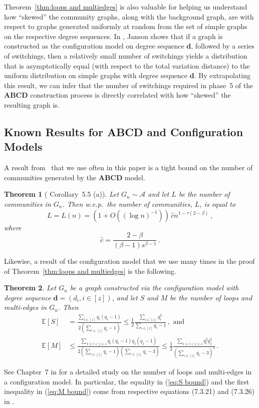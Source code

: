 \documentclass[12pt]{article}
\newtheorem{theorem}{Theorem}
\theoremstyle{definition}
\theoremstyle{remark}
\theoremstyle{remark}
\numberwithin{theorem}{section}
\newcommand{\E}[1]{{\mathbb E}\left[#1\right]}
\newcommand{\abcdDist}{\ensuremath{\mathcal{A}}}
\begin{document}
Theorem~\ref{thm:loops and multiedges} is also valuable for helping us understand how ``skewed'' the community graphs, along with the background graph, are with respect to graphs generated uniformly at random from the set of simple graphs on the respective degree sequences. In \cite{janson2020random}, Janson shows that if a graph is constructed as the configuration model on degree sequence $\mathbf{d}$, followed by a series of switchings, then a relatively small number of switchings yields a distribution that is asymptotically equal (with respect to the total variation distance) to the uniform distribution on simple graphs with degree sequence $\mathbf{d}$. By extrapolating this result, we can infer that the number of switchings required in phase~5 of the \textbf{ABCD} construction process is directly correlated with how ``skewed'' the resulting graph is.

\subsection{Known Results for \textbf{ABCD} and Configuration Models}\label{sec:old_results}

A result from~\cite{kaminski2022modularity} that we use often in this paper is a tight bound on the number of communities generated by the \textbf{ABCD} model.

\begin{theorem}[\cite{kaminski2022modularity} Corollary~5.5 (a)]\label{thm:previous_paper}
Let $G_n \sim \abcdDist$ and let $L$ be the number of communities in $G_n$. Then w.e.p.\ 
the number of communities, $L$, is equal to 
\[
L = L(n) = \left( 1 + O\left( (\log n)^{-1} \right) \right) \, \hat{c} n^{1-\tau(2-\beta)} \,,
\]
where
\[
\hat{c} = \frac{2-\beta}{(\beta-1)s^{\beta-1}} \,.
\]
\end{theorem} 
Likewise, a result of the configuration model that we use many times in the proof of Theorem~\ref{thm:loops and multiedges} is the following. 
\begin{theorem}\label{thm:S and M bound}
Let $G_n$ be a graph constructed via the configuration model with degree sequence $\mathbf{d} = (d_i, i \in [z])$, and let $S$ and $M$ be the number of loops and multi-edges in $G_n$. Then
\begin{align}
\E{S} 
&= 
\frac{\sum_{i \in [z]} q_i(q_i-1)}{2\left( \sum_{i \in [z]} q_i - 1 \right)} 
\leq
\frac{1}{2} \frac{\sum_{i \in [z]} q_i^2}{\sum_{i \in [z]} q_i - 1}   \,, \text{ and} \label{eq:S bound} \\
\E{M} 
&\leq
\frac{\sum_{1 \leq i < j \leq z} q_i(q_i-1)q_j(q_j-1)}{2\left( \sum_{i \in [z]} q_i - 1 \right)\left( \sum_{i \in [z]} q_i - 3 \right)} 
\leq
\frac{1}{2}\frac{\sum_{1 \leq i < j \leq z} q_i^2q_j^2}{\left( \sum_{i \in [z]} q_i - 3 \right)^2} \,. \label{eq:M bound} 
\end{align}
\end{theorem}
See Chapter~7 in \cite{van2016random} for a detailed study on the number of loops and multi-edges in a configuration model. In particular, the equality in (\ref{eq:S bound}) and the first inequality in (\ref{eq:M bound}) come from respective equations (7.3.21) and (7.3.26) in \cite{van2016random}. 
\end{document}
